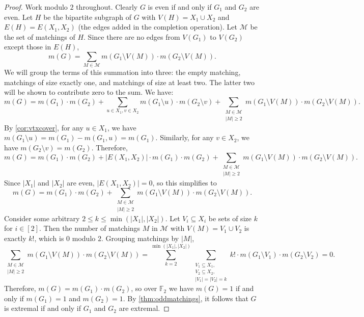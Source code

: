 \documentclass{amsart}
\theoremstyle{definition}
\theoremstyle{remark}
\newcommand{\sm}{\setminus}
\begin{document}
\begin{proof}
    Work modulo $2$ throughout. Clearly $G$ is even if and only if $G_1$ and $G_2$ are even. Let $H$ be the bipartite subgraph of $G$ with $V(H) = X_1\cup X_2$ and $E(H) = E(X_1,X_2)$ (the edges added in the completion operation). 
    Let $\mathcal M$ be the set of matchings of $H$. Since there are no edges from $V(G_1)$ to $V(G_2)$ except those in $E(H)$, 
    \[
        m(G) = \sum_{M\in \mathcal M} m(G_1\setminus V(M)) \cdot m(G_2\setminus V(M)).
    \]
    We will group the terms of this summation into three: the empty matching, matchings of size exactly one, and matchings of size at least two. The latter two will be shown to contribute zero to the sum. We have:
    \[
        m(G) = m(G_1)\cdot m(G_2) + \sum_{u\in X_1, v\in X_2} m(G_1\sm u) \cdot m(G_2\sm v) + \sum_{\substack{M\in \mathcal M\\ |M| \geq 2}} m(G_1\sm V(M)) \cdot m(G_2\sm V(M)).
    \]
    By \cref{cor:vtxcover}, for any $u\in X_1$, we have $m(G_1\setminus u) = m(G_1) - m(G_1,u) = m(G_1)$. Similarly, for any $v\in X_2$, we have $m(G_2\setminus v) = m(G_2)$. Therefore,
    \[
        m(G) = m(G_1)\cdot m(G_2)  + |E(X_1,X_2)| \cdot m(G_1)\cdot m(G_2) + \sum_{\substack{M\in \mathcal M\\ |M| \geq 2}} m(G_1\sm V(M)) \cdot m(G_2\sm V(M)).
    \]
    Since $|X_1|$ and $|X_2|$ are even, $|E(X_1,X_2)| = 0$, so this simplifies to
    \[
        m(G) = m(G_1)\cdot m(G_2)  + \sum_{\substack{M\in \mathcal M\\ |M| \geq 2}} m(G_1\sm V(M)) \cdot m(G_2\sm V(M)). 
    \]
    Consider some arbitrary $2\le k\le \min(|X_1|,|X_2|)$. Let $V_i\subseteq X_i$ be sets of size $k$ for $i\in[2]$. Then the number of matchings $M$ in $\mathcal M$ with $V(M) = V_1\cup V_2$ is exactly $k!$, which is $0$ modulo $2$. Grouping matchings by $|M|$,
    \[
        \sum_{\substack{M\in \mathcal M\\ |M| \geq 2}} m(G_1\sm V(M)) \cdot m(G_2\sm V(M)) =  \sum_{k=2}^{\min(|X_1|,|X_2|)} \sum_{\substack{V_1 \subseteq X_1,\\ V_2 \subseteq X_2,\\ |V_1|=|V_2|=k}} k! \cdot m(G_1\sm V_1) \cdot m(G_2\sm V_2) = 0.
    \]
    Therefore, $m(G) = m(G_1)\cdot m(G_2)$, so over $\mathbb F_2$ we have $m(G) = 1$ if and only if $m(G_1) = 1$ and $m(G_2)=1$. By \cref{thm:oddmatchings}, it follows that $G$ is extremal if and only if $G_1$ and $G_2$ are extremal. 
\end{proof}
\end{document}
